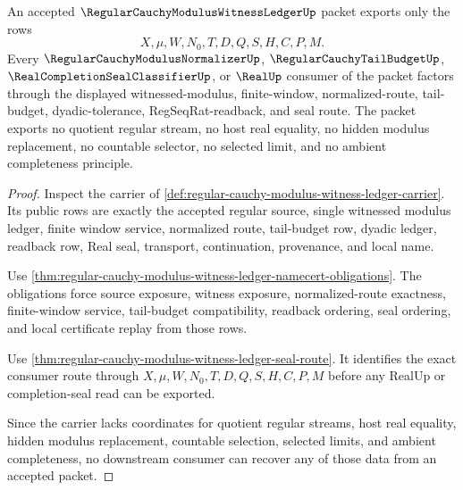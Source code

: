 \begin{theorem}
\label{thm:regular-cauchy-modulus-witness-ledger-nonescape}
An accepted $\RegularCauchyModulusWitnessLedgerUp$ packet exports only the rows
$$
X,\mu,W,N_0,T,D,Q,S,H,C,P,M.
$$
Every $\RegularCauchyModulusNormalizerUp$, $\RegularCauchyTailBudgetUp$, $\RealCompletionSealClassifierUp$, or $\RealUp$ consumer of the packet factors through the displayed witnessed-modulus, finite-window, normalized-route, tail-budget, dyadic-tolerance, RegSeqRat-readback, and seal route. The packet exports no quotient regular stream, no host real equality, no hidden modulus replacement, no countable selector, no selected limit, and no ambient completeness principle.
\end{theorem}
\begin{proof}
Inspect the carrier of \autoref{def:regular-cauchy-modulus-witness-ledger-carrier}. Its public rows are exactly the accepted regular source, single witnessed modulus ledger, finite window service, normalized route, tail-budget row, dyadic ledger, readback row, Real seal, transport, continuation, provenance, and local name.

Use \autoref{thm:regular-cauchy-modulus-witness-ledger-namecert-obligations}. The obligations force source exposure, witness exposure, normalized-route exactness, finite-window service, tail-budget compatibility, readback ordering, seal ordering, and local certificate replay from those rows.

Use \autoref{thm:regular-cauchy-modulus-witness-ledger-seal-route}. It identifies the exact consumer route through $X,\mu,W,N_0,T,D,Q,S,H,C,P,M$ before any RealUp or completion-seal read can be exported.

Since the carrier lacks coordinates for quotient regular streams, host real equality, hidden modulus replacement, countable selection, selected limits, and ambient completeness, no downstream consumer can recover any of those data from an accepted packet.
\end{proof}

